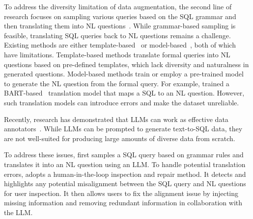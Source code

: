 To address the diversity limitation of data augmentation, the second line of research focuses on  sampling various queries based on the SQL grammar and then translating them into NL questions~\cite{conda, simiar_algorithm}. 
While grammar-based sampling is feasible, translating SQL queries back to NL questions remains a challenge. Existing methods are either template-based~\cite{STEPS, sqlucid, logos, explaininnl, SQL-to-text, diy, NaLIR} or model-based~\cite{IRnet, sql_to_text2, sql_to_text3, PCFG_SQL_synthesize}, both of which have limitations. Template-based methods translate formal queries into NL questions based on pre-defined templates, which lack diversity and naturalness in generated questions. Model-based methods train or employ a pre-trained model to generate the NL question from the formal query. 
For example, \cite{PCFG_SQL_synthesize} trained a BART-based~\cite{bart} translation model that maps a SQL to an NL question. 
However, such translation models can introduce errors and make the dataset unreliable.

Recently, research has demonstrated that LLMs can work as effective data annotators~\cite{llm_data_annotation, annollm, llm_annotator_1, chatgpt_outperform_crowd_workers, self_instruct, oss_instruct, evol_instruct}. 
While LLMs can be prompted to generate text-to-SQL data, they are not well-suited for producing large amounts of diverse data from scratch. 

To address these issues, {\tool} first samples a SQL query based on grammar rules and translates it into an NL question using an LLM. To handle potential translation errors, {\tool} adopts a human-in-the-loop inspection and repair method. It detects and highlights any potential misalignment between the SQL query and NL questions for user inspection. It then allows users to fix the alignment issue by injecting missing information and removing redundant information in collaboration with the LLM.






